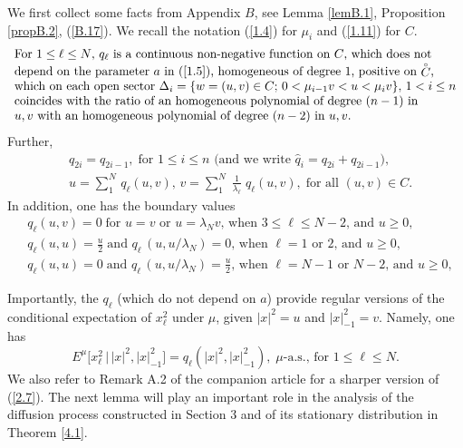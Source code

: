 \documentclass[12pt,leqno]{article}
\def\n{\noindent}
\def\dis{\displaystyle}
\def\wh{\widehat}
\begin{document}
\medskip
We first collect some facts from Appendix $B$, see Lemma \ref{lemB.1}, Proposition \ref{propB.2}, (\ref{B.17}). We recall the notation (\ref{1.4}) for $\mu_i$ and (\ref{1.11}) for $C$.
\begin{equation}\label{2.1}
\begin{array}{l}
\mbox{For $1 \le \ell \le N$, $q_\ell$ is a continuous non-negative function on $C$, which does not}\\
\mbox{depend on the parameter $a$ in (\ref{1.5}), homogeneous of degree $1$, positive on $\stackrel{_\circ}{C}$,}\\
\mbox{which on each open sector $\Delta_i = \{w = (u,v) \in C$; $0 < \mu_{i-1} v < u < \mu_i v\}$, $1 < i \le n$}\\
\mbox{coincides with the ratio of an homogeneous polynomial of degree $(n-1)$ in}\\
\mbox{$u,v$ with an homogeneous polynomial of degree $(n-2)$ in $u,v$.}
\end{array}
\end{equation}
Further,
\begin{align}
& q_{2i} = q_{2i-1}, \; \mbox{for $1 \le i \le n$ (and we write $\wh{q}_i = q_{2i} + q_{2i - 1})$}, \label{2.2}
\\ 
& u = \sum_1^N \,q_\ell(u,v), \, v = \sum_1^N \; \dis\frac{1}{\lambda_\ell} \;q_\ell (u,v), \; \mbox{for all $(u,v) \in C$}. \label{2.3}
\end{align}
In addition, one has the boundary values
\begin{align}
& q_\ell (u,v) = 0 \; \mbox{for $u = v$ or $u = \lambda_N v$, when $3 \le \ell \le N-2$, and $u \ge 0$}, \label{2.4}
\\[1ex]
&q_\ell (u,u) = \dis\frac{u}{2} \; \mbox{and $q_\ell \,(u, u/\lambda_N) = 0$, when $\ell = 1$ or $2$, and $u \ge 0$}, \label{2.5}
\\[1ex]
& q_\ell(u,u) = 0 \; \mbox{and $q_\ell \, (u, u/\lambda_N) = \dis\frac{u}{2}$, when $\ell = N - 1$ or $N-2$, and $u \ge 0$}, \label{2.6}
\end{align}

\n
Importantly, the $q_\ell$ (which do not depend on $a$) provide regular versions of the conditional expectation of $x^2_\ell$ under $\mu$, given $|x|^2 = u$ and $|x|^2_{-1} = v$. Namely, one has
\begin{equation}\label{2.7}
E^\mu \big[x^2_\ell \, \big| \, |x|^2, |x|^2_{-1}\big] = q_\ell (|x|^2, |x|^2_{-1}), \;\mbox{$\mu$-a.s., for $1 \le \ell \le N$.}
\end{equation}
We also refer to Remark A.2 of the companion article \cite{SzniWidm26b} for a sharper version of (\ref{2.7}). The next lemma will play an important role in the analysis of the diffusion process constructed in Section 3 and of its stationary distribution in Theorem \ref{4.1}.
\end{document}
